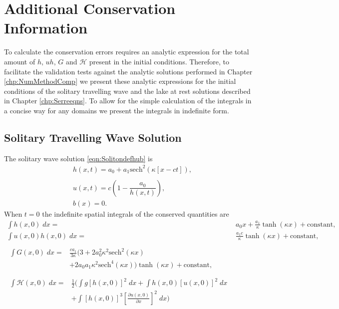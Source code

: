 \chapter{Additional Conservation Information}
\label{app:ConQuant}
To calculate the conservation errors requires an analytic expression for the total amount of $h$, $uh$, $G$ and $\mathcal{H}$ present in the initial conditions. Therefore, to facilitate the validation tests against the analytic solutions performed in Chapter \ref{chp:NumMethodComp} we present these analytic expressions for the initial conditions of the solitary travelling wave and the lake at rest solutions described in Chapter \ref{chp:Serreeqns}. To allow for the simple calculation of the integrals in a concise way for any domains we present the integrals in indefinite form. 

\section{Solitary Travelling Wave Solution}
The solitary wave solution \eqref{eqn:Solitondefhub} is
	\begin{align*}
	&h(x,t) = a_0 + a_1\text{sech}^2\left(\kappa \left[x - ct\right]\right), \\  \nonumber \\
	&u(x,t) = c\left(1 - \dfrac{a_0}{h(x,t)}\right), \\
	&b(x) = 0.
	\end{align*}
\begingroup
When $t=0$ the indefinite spatial integrals of the conserved quantities are
\allowdisplaybreaks
\begin{subequations}
	\begin{align}
	\int h(x,0) \; dx = {} & a_0 x + \frac{a_1}{\kappa} \tanh\left(\kappa x\right) + \text{constant}, \label{eqn:SolitonConservationh} \\
	\int u(x,0)h(x,0) \;  dx = {} & \frac{a_1 c}{\kappa} \tanh\left(\kappa x\right)+ \text{constant}, \label{eqn:SolitonConservationuh} \\  \nonumber \\
	\begin{split}
	\int G(x,0) \; dx = {}&  \frac{c a_1}{3 \kappa}  \Bigg(3 + 2a_0^2 \kappa^2\text{sech}^2\left(\kappa x\right)  \\ &+ 2a_0 a_1 \kappa^2 \text{sech}^4\left(\kappa x\right) \Bigg)\tanh\left(\kappa x\right)  + \text{constant} ,
	\end{split} \label{eqn:SolitonConservationG}
	\\  \nonumber \\
	\begin{split}
	\int \mathcal{H}(x,0) \; dx = {}&\frac{1}{2} \Bigg(\int g\left[h(x,0)\right]^2 \; dx + \int h(x,0)\left[u(x,0)\right]^2 \; dx  \\ &+ \int \left[h(x,0)\right]^3 \left[\frac{\partial u(x,0)}{\partial x}\right]^2 \; dx \Bigg) \label{eqn:SolitonConservationH}
	\end{split}
	\end{align}
	\label{eqn:SolitonConservation}
\end{subequations}

